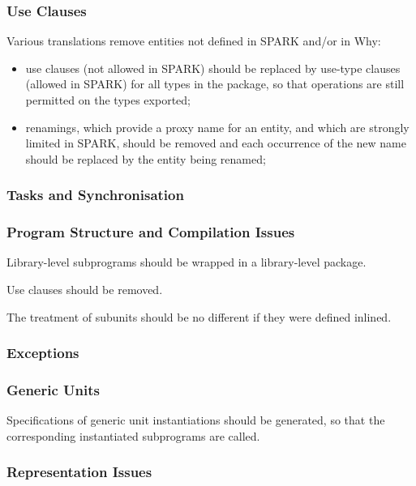 \documentclass[fullpage]{article}
\begin{document}
\subsubsection{Use Clauses}

Various translations remove entities not defined in SPARK and/or in Why:
\begin{itemize}
\item use clauses (not allowed in SPARK) should be replaced by use-type clauses
  (allowed in SPARK) for all types in the package, so that operations are still
  permitted on the types exported;
\item renamings, which provide a proxy name for an entity, and which are
  strongly limited in SPARK, should be removed and each occurrence of the
  new name should be replaced by the entity being renamed;
\end{itemize}

\subsubsection{Tasks and Synchronisation}

\subsubsection{Program Structure and Compilation Issues}

Library-level subprograms should be wrapped in a library-level package.

Use clauses should be removed.

The treatment of subunits should be no different if they were defined inlined.

\subsubsection{Exceptions}

\subsubsection{Generic Units}

Specifications of generic unit instantiations should be generated, so that the
corresponding instantiated subprograms are called.

\subsubsection{Representation Issues}
\end{document}
